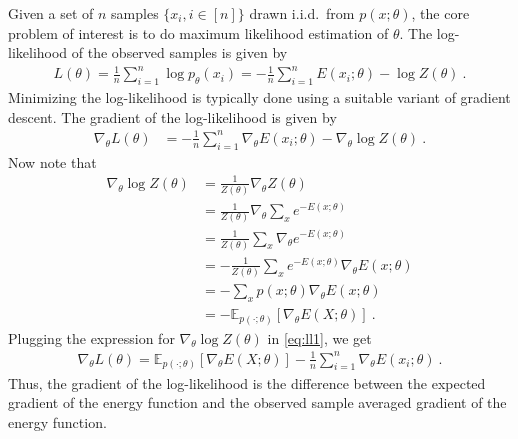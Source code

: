 \documentclass{article}
\newcommand\E{\mathbb{E}}
\begin{document}
Given a set of $n$ samples $\{x_i, i \in [n]\}$ drawn i.i.d.~from $p(x;\theta)$, the core problem of interest is to do maximum likelihood estimation of $\theta$. The log-likelihood of the observed samples is given by
\begin{align}
	L(\theta) = \frac{1}{n} \sum_{i=1}^n \log p_{\theta}(x_i) = - \frac{1}{n} \sum_{i=1}^n E(x_i;\theta) - \log Z(\theta)~.
\end{align}
Minimizing the log-likelihood is typically done using a suitable variant of gradient descent. The gradient of the log-likelihood is given by
\begin{align}
	\nabla_{\theta} L(\theta) & = - \frac{1}{n} \sum_{i=1}^n \nabla_{\theta} E(x_i;\theta) - \nabla_{\theta} \log Z(\theta)~.
	\label{eq:ll1}
\end{align}
Now note that
\begin{align*}
	\nabla_{\theta} \log Z(\theta) & = \frac{1}{Z(\theta)} \nabla_{\theta} Z(\theta) \\
	& = \frac{1}{Z(\theta)} \nabla_{\theta}  \sum_{x} e^{-E(x;\theta)} \\
	& = \frac{1}{Z(\theta)} \sum_{x} \nabla_{\theta}   e^{-E(x;\theta)} \\
	& = - \frac{1}{Z(\theta)} \sum_{x}  e^{-E(x;\theta)} \nabla_{\theta}  E(x;\theta) \\
	& = - \sum_x p(x;\theta) \nabla_{\theta}  E(x;\theta) \\
	& = - \E_{p(\cdot;\theta)}[ \nabla_{\theta} E(X;\theta)]~.
\end{align*}
Plugging the expression for $\nabla_{\theta} \log Z(\theta)$ in \eqref{eq:ll1}, we get
\begin{align}
	\nabla_{\theta} L(\theta) = \E_{p(\cdot;\theta)}[ \nabla_{\theta} E(X;\theta)] - \frac{1}{n} \sum_{i=1}^n \nabla_{\theta} E(x_i;\theta)~.
	\label{eq:ll2}
\end{align}
Thus, the gradient of the log-likelihood is the difference between the expected gradient of the energy function and the observed sample averaged gradient of the energy function. 
\end{document}
